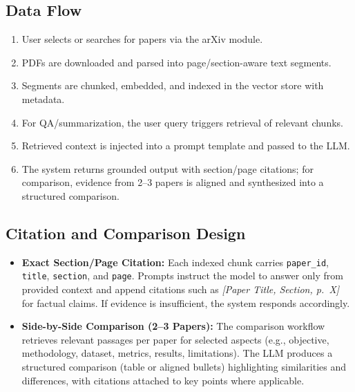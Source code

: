 \subsection{Data Flow}
\begin{enumerate}
    \item User selects or searches for papers via the arXiv module.
    \item PDFs are downloaded and parsed into page/section-aware text segments.
    \item Segments are chunked, embedded, and indexed in the vector store with metadata.
    \item For QA/summarization, the user query triggers retrieval of relevant chunks.
    \item Retrieved context is injected into a prompt template and passed to the LLM.
    \item The system returns grounded output with section/page citations; for comparison, evidence from 2--3 papers is aligned and synthesized into a structured comparison.
\end{enumerate}

\subsection{Citation and Comparison Design}
\begin{itemize}
    \item \textbf{Exact Section/Page Citation:} Each indexed chunk carries \texttt{paper\_id}, \texttt{title}, \texttt{section}, and \texttt{page}. Prompts instruct the model to answer only from provided context and append citations such as \textit{[Paper Title, Section, p.~X]} for factual claims. If evidence is insufficient, the system responds accordingly.
    \item \textbf{Side-by-Side Comparison (2--3 Papers):} The comparison workflow retrieves relevant passages per paper for selected aspects (e.g., objective, methodology, dataset, metrics, results, limitations). The LLM produces a structured comparison (table or aligned bullets) highlighting similarities and differences, with citations attached to key points where applicable.
\end{itemize}

